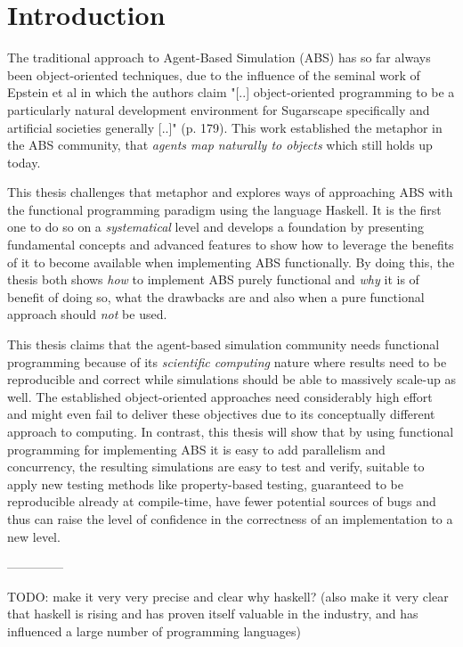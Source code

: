 \chapter{Introduction}
The traditional approach to Agent-Based Simulation (ABS) has so far always been object-oriented techniques, due to the influence of the seminal work of Epstein et al \cite{epstein_growing_1996} in which the authors claim "[..] object-oriented programming to be a particularly natural development environment for Sugarscape specifically and artificial societies generally [..]" (p. 179). This work established the metaphor in the ABS community, that \textit{agents map naturally to objects} \cite{north_managing_2007} which still holds up today.

This thesis challenges that metaphor and explores ways of approaching ABS with the functional programming paradigm using the language Haskell. It is the first one to do so on a \textit{systematical} level and develops a foundation by presenting fundamental concepts and advanced features to show how to leverage the benefits of it \cite{hudak_haskell_1994, hudak_history_2007} to become available when implementing ABS functionally. By doing this, the thesis both shows \textit{how} to implement ABS purely functional and \textit{why} it is of benefit of doing so, what the drawbacks are and also when a pure functional approach should \textit{not} be used. 

This thesis claims that the agent-based simulation community needs functional programming because of its \textit{scientific computing} nature where results need to be reproducible and correct while simulations should be able to massively scale-up as well. The established object-oriented approaches need considerably high effort and might even fail to deliver these objectives due to its conceptually different approach to computing. In contrast, this thesis will show that by using functional programming for implementing ABS it is easy to add parallelism and concurrency, the resulting simulations are easy to test and verify, suitable to apply new testing methods like property-based testing, guaranteed to be reproducible already at compile-time, have fewer potential sources of bugs and thus can raise the level of confidence in the correctness of an implementation to a new level.

--------------

TODO: make it very very precise and clear why haskell? (also make it very clear that haskell is rising and has proven itself valuable in the industry, and has influenced a large number of programming languages)

